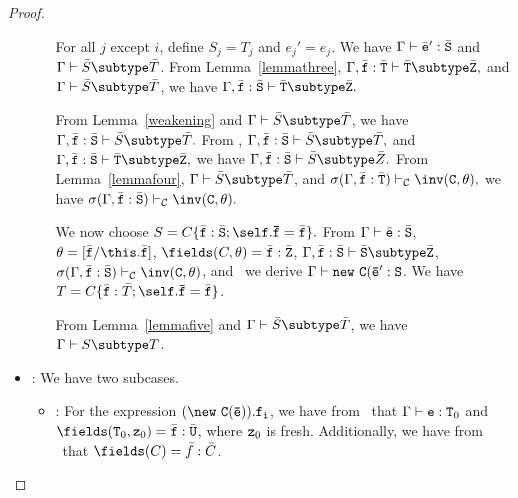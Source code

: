 \begin{proof}
\begin{itemize}
\begin{itemize}
            For all $j$ except $i$, define $S_j = T_j$ and $e_j' = e_j$.
            We have 
            $\Gamma \vdash \bar{\tt e}': \bar{\tt S}$ and
            $\Gamma \vdash \bar{S} \subtype \bar{T}$.
            From Lemma~\ref{lemmathree},
            $\Gamma, \bar{\tt f}: \bar{\tt T} \vdash
                    \bar{\tt T} \subtype \bar{\tt Z},$
            and $\Gamma \vdash \bar{S} \subtype \bar{T}$, we have
            $\Gamma, \bar{\tt f}: \bar{\tt S} \vdash
                    \bar{\tt T} \subtype \bar{\tt Z}.$

            From Lemma~\ref{weakening} and 
            $\Gamma \vdash \bar{S} \subtype \bar{T}$, 
            we have 
            $\Gamma, \bar{\tt f}: \bar{\tt S} \vdash \bar{S} \subtype \bar{T}.$
            From ,
            $\Gamma, \bar{\tt f}: \bar{\tt S} \vdash \bar{S} \subtype \bar{T},$
            and
            $\Gamma, \bar{\tt f}: \bar{\tt S} \vdash
                    \bar{\tt T} \subtype \bar{\tt Z},$ we have
            $\Gamma, \bar{\tt f}: \bar{\tt S} \vdash \bar{S} \subtype \bar{Z}.$
            From Lemma~\ref{lemmafour}, 
            $\Gamma \vdash \bar{S} \subtype \bar{T}$, and
            $\sigma(\Gamma, \bar{\tt f}: \bar{\tt T}) \vdash_{\cal C}
                    \inv({\tt C},\theta),$
            we have
            $\sigma(\Gamma, \bar{\tt f}: \bar{\tt S}) \vdash_{\cal C}
                    \inv({\tt C},\theta).$

            We now choose 
              $S=C\{\bar{\tt f}: \bar{\tt S}{\tt ;\self.\bar{f}}=\bar{\tt f}\}.$
            From 
            $\Gamma \vdash \bar{\tt e}: \bar{\tt S}$,
            $\theta=[\bar{\tt f}/\this.\bar{\tt f}]$,
            $\fields(C,\theta)=\bar{\tt f}: \bar{\tt Z}$,
            $\Gamma, \bar{\tt f}: \bar{\tt S} \vdash
                    \bar{\tt S} \subtype \bar{\tt Z}$,
            $\sigma(\Gamma, \bar{\tt f}: \bar{\tt S}) \vdash_{\cal C}
                    \inv({\tt C},\theta)$, and \TNew\ we derive
            $\Gamma \vdash {\tt new\ C(\bar{e}'}: {\tt S}$.
            We have 
               $T=C\{\bar{\tt f}: \bar{T}{\tt ;\self.\bar{f}}=\bar{\tt f}\}$.

            From Lemma~\ref{lemmafive} and
            $\Gamma \vdash \bar{S} \subtype \bar{T}$, we have
            $\Gamma \vdash S \subtype T$.
   \end{itemize}
\item
\TField: We have two subcases.
   \begin{itemize}
   \item
   \RField:  For the expression ${\tt (\new\ C(\bar{e})).f_i}$, 
             we have from \TField\ that
             $\Gamma \vdash {\tt e}: {\tt T}_0$ and
             $\fields({\tt T}_0,{\tt z}_0) = \bar{\tt f}: \bar{\tt U}$, where
             ${\tt z}_0$ is fresh.
             Additionally, we have from \RField\ that
             $\fields(C)=\bar{f}: \bar{C}$.


\end{itemize}
\end{itemize}
\end{proof}
